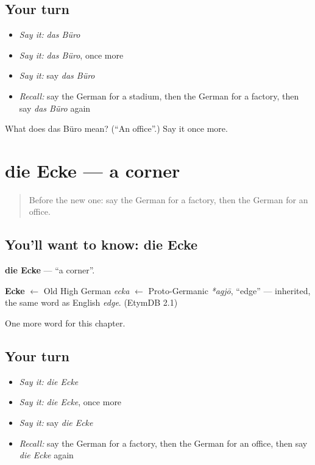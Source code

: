 \subsection*{Your turn}
\begin{itemize}
\raggedright
  \item \emph{Say it:} \emph{das Büro}
  \item \emph{Say it:} \emph{das Büro}, once more
  \item \emph{Say it:} say \emph{das Büro}
  \item \emph{Recall:} say the German for a stadium, then the German for a factory, then say \emph{das Büro} again
\end{itemize}

\begin{tcolorbox}[breakable,colback=teal!4,colframe=teal!35!black,title={Before you move on}]
What does das Büro mean? (\textquotedblleft{}An office\textquotedblright{}.) Say it once more.
\end{tcolorbox}
\section[die Ecke]{die Ecke — a corner}

\label{lesson:GE-C107-ecke}



\begin{quote}
Before the new one: say the German for a factory, then the German for an office.
\end{quote}

\subsection*{You'll want to know: die Ecke}
\textbf{die Ecke} — \textquotedblleft{}a corner\textquotedblright{}.

\begin{cousinweb}
\textbf{Ecke} $\leftarrow$ Old High German \emph{ecka} $\leftarrow$ Proto-Germanic \emph{*agjō}, \textquotedblleft{}edge\textquotedblright{} — inherited, the same word as English \emph{edge}. (EtymDB 2.1)
\end{cousinweb}

\begin{grammarlens}[title={What you've built}]
One more word for this chapter.
\end{grammarlens}

\subsection*{Your turn}
\begin{itemize}
\raggedright
  \item \emph{Say it:} \emph{die Ecke}
  \item \emph{Say it:} \emph{die Ecke}, once more
  \item \emph{Say it:} say \emph{die Ecke}
  \item \emph{Recall:} say the German for a factory, then the German for an office, then say \emph{die Ecke} again
\end{itemize}

